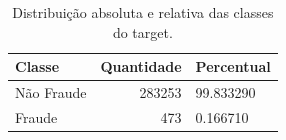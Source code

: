 \begin{table}
\caption{Distribuição absoluta e relativa das classes do target.}
\label{tab:distribuicao-target}
\begin{tabular}{lrl}
\toprule
Classe & Quantidade & Percentual \\
\midrule
Não Fraude & 283253 & 99.833290 \\
Fraude & 473 & 0.166710 \\
\bottomrule
\end{tabular}
\end{table}
